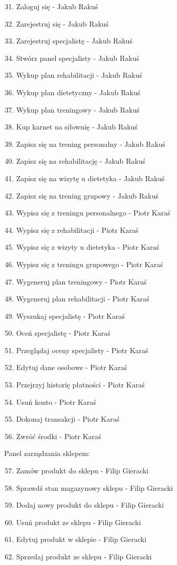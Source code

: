 \begin{enumerate}
\setcounter{enumi}{30}
\tightlist
\item
  {Zaloguj się - Jakub Rakuś}
\item
  {Zarejestruj się - Jakub Rakuś}
\item
  {Zarejestruj specjalistę - Jakub Rakuś}
\item
  {Stwórz panel specjalisty - Jakub Rakuś}
\item
  {Wykup plan rehabilitacji - Jakub Rakuś}
\item
  {Wykup plan dietetyczny - Jakub Rakuś}
\item
  {Wykup plan treningowy - Jakub Rakuś}
\item
  {Kup karnet na siłownię - Jakub Rakuś}
\item
  {Zapisz się na trening personalny - Jakub Rakuś}
\item
  {Zapisz się na rehabilitację - Jakub Rakuś}
\item
  {Zapisz się na wizytę u dietetyka - Jakub Rakuś}
\item
  {Zapisz się na trening grupowy - Jakub Rakuś}
\item
  {Wypisz się z treningu personalnego - Piotr Karaś}
\item
  {Wypisz się z rehabilitacji - Piotr Karaś}
\item
  {Wypisz się z wizyty u dietetyka - Piotr Karaś}
\item
  {Wypisz się z treningu grupowego - Piotr Karaś}
\item
  {Wygeneruj plan treningowy - Piotr Karaś}
\item
  {Wygeneruj plan rehabilitacji - Piotr Karaś}
\item
  {Wyszukaj specjalistę - Piotr Karaś}
\item
  {Oceń specjalistę - Piotr Karaś}
\item
  {Przeglądaj oceny specjalisty - Piotr Karaś}
\item
  {Edytuj dane osobowe - Piotr Karaś}
\item
  {Przejrzyj historię płatności - Piotr Karaś}
\item
  {Usuń konto - Piotr Karaś}
\item
  {Dokonaj transakcji - Piotr Karaś}
\item
  {Zwróć środki - Piotr Karaś}
\end{enumerate}

{Panel zarządzania sklepem:}

\begin{enumerate}
\setcounter{enumi}{56}
\tightlist
\item
{Zamów produkt do sklepu - Filip Gieracki}
\item
{Sprawdź stan magazynowy sklepu - Filip Gieracki}
\item
{Dodaj nowy produkt do sklepu - Filip Gieracki}
\item
{Usuń produkt ze sklepu - Filip Gieracki}
\item
{Edytuj produkt w sklepie - Filip Gieracki}
\item
{Sprzedaj produkt ze sklepu - Filip Gieracki}
\end{enumerate}
